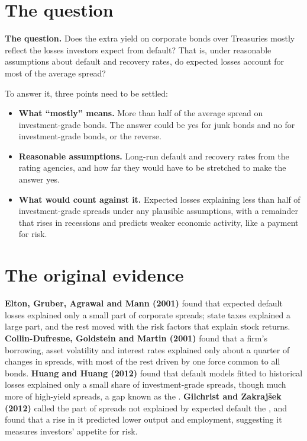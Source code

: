 \section{The question}
\label{sec:15-claim}

\begin{callout}
\textbf{The question.} Does the extra yield on corporate bonds over Treasuries mostly reflect the losses investors expect from default? That is, under reasonable assumptions about default and recovery rates, do expected losses account for most of the average spread?
\end{callout}

To answer it, three points need to be settled:

\begin{itemize}
  \item \textbf{What ``mostly'' means.} More than half of the average spread on investment-grade bonds. The answer could be yes for junk bonds and no for investment-grade bonds, or the reverse.
  \item \textbf{Reasonable assumptions.} Long-run default and recovery rates from the rating agencies, and how far they would have to be stretched to make the answer yes.
  \item \textbf{What would count against it.} Expected losses explaining less than half of investment-grade spreads under any plausible assumptions, with a remainder that rises in recessions and predicts weaker economic activity, like a payment for risk.
\end{itemize}

\section{The original evidence}
\label{sec:15-evidence}

\textbf{Elton, Gruber, Agrawal and Mann (2001)} found that expected default losses explained only a small part of corporate spreads; state taxes explained a large part, and the rest moved with the risk factors that explain stock returns. \textbf{Collin-Dufresne, Goldstein and Martin (2001)} found that a firm's borrowing, asset volatility and interest rates explained only about a quarter of changes in spreads, with most of the rest driven by one force common to all bonds. \textbf{Huang and Huang (2012)} found that default models fitted to historical losses explained only a small share of investment-grade spreads, though much more of high-yield spreads, a gap known as the . \textbf{Gilchrist and Zakraj\v{s}ek (2012)} called the part of spreads not explained by expected default the , and found that a rise in it predicted lower output and employment, suggesting it measures investors' appetite for risk.

